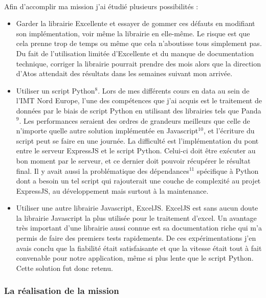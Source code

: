 \documentclass[12pt]{article}
\begin{document}
\begin {sloppypar}
\paragraph {}
Afin d'accomplir ma mission j'ai étudié plusieurs possibilités : 
\begin{itemize}
  \item 
    Garder la librairie Excellente et essayer de gommer ces défauts en modifiant
    son implémentation, voir même la librairie en elle-même. 
    Le risque est que cela prenne trop de temps ou même que cela n'aboutisse tous 
    simplement pas. Du fait de l'utilisation limitée d'Excellente et du manque de documentation 
    technique, corriger la librairie pourrait prendre des mois alors que la direction d'Atos 
    attendait des résultats dans les semaines suivant mon arrivée.
  \item 
    Utiliser un script Python$^{8}$. Lors de mes différents cours en data au sein de l'IMT Nord 
    Europe, l'une des compétences que j'ai acquis est le traitement de données par le biais 
    de script Python en utilisant des librairies tels que Panda$^{9}$. Les performances 
    seraient des ordres de grandeurs meilleurs que celle de n'importe quelle autre solution 
    implémentée en Javascript$^{10}$, et l'écriture du script peut se faire en une journée. 
    La difficulté est l'implémentation du pont entre le serveur ExpressJS et le script Python. 
    Celui-ci doit être exécuter au bon moment par le serveur, et ce dernier doit pouvoir 
    récupérer le résultat final. Il y avait aussi la problématique des dépendances$^{11}$ spécifique
    à Python dont a besoin un tel script qui rajouterait une couche de complexité au projet ExpressJS, au 
    développement mais surtout à la maintenance.
  \item 
    Utiliser une autre librairie Javascript, ExcelJS. ExcelJS est sans aucun doute 
    la librairie Javascript la plus utilisée pour le traitement d'excel. Un avantage très important 
    d'une librairie aussi connue est sa documentation riche qui m'a permis de faire des premiers 
    tests rapidements. De ces expérimentations j'en avais conclu que la fiabilité était 
    satisfaisante et que la vitesse était tout à fait convenable pour notre application, même si 
    plus lente que le script Python. Cette solution fut donc retenu.
\end{itemize}
\newpage
\subsubsection{La réalisation de la mission}

\end{sloppypar}
\end{document}
